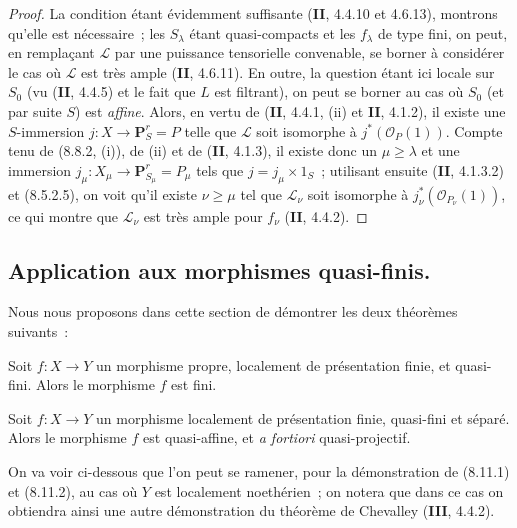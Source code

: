 \begin{proof}
La condition étant évidemment suffisante (\textbf{II}, 4.4.10 et 4.6.13), montrons
qu'elle est nécessaire~; les $S_\lambda$ étant quasi-compacts et les
$f_\lambda$ de type fini, on peut, en remplaçant $\mathcal L$ par une puissance
tensorielle convenable, se borner à considérer le cas où $\mathcal L$ est très
ample (\textbf{II}, 4.6.11). En outre, la question étant ici locale sur $S_0$ (vu
(\textbf{II}, 4.4.5) et le fait que $L$ est filtrant), on peut se borner au cas où
$S_0$ (et par suite $S$) est \emph{affine}. Alors, en vertu de (\textbf{II}, 4.4.1, (ii) et
\textbf{II}, 4.1.2), il existe une $S$-immersion
$j:X\to\mathbf P_S^r=P$ telle que $\mathcal L$ soit isomorphe à
$j^*(\mathcal O_P(1))$. Compte tenu de (8.8.2, (i)), de (ii) et de
(\textbf{II}, 4.1.3), il existe donc un $\mu\geq\lambda$ et une immersion
$j_\mu:X_\mu\to\mathbf P_{S_\mu}^r=P_\mu$ tels que
$j=j_\mu\times1_S$~; utilisant ensuite (\textbf{II}, 4.1.3.2) et (8.5.2.5), on voit
qu'il existe $\nu\geq\mu$ tel que $\mathcal L_\nu$ soit isomorphe à
$j_\nu^*(\mathcal O_{P_\nu}(1))$, ce qui montre que $\mathcal L_\nu$ est très
ample pour $f_\nu$ (\textbf{II}, 4.4.2).
\end{proof}

\subsection{Application aux morphismes quasi-finis.}
\label{subsection:IV.8.11-fr}
\label{IV.8.11-fr}

Nous nous proposons dans cette section de démontrer les deux théorèmes
suivants~:

\begin{theorem}[8.11.1]
Soit $f:X\to Y$ un morphisme propre, localement de présentation finie, et
quasi-fini. Alors le morphisme $f$ est fini.
\end{theorem}

\begin{theorem}[8.11.2]
\label{IV.8.11.2-fr}
Soit $f:X\to Y$ un morphisme localement de présentation finie, quasi-fini et
séparé. Alors le morphisme $f$ est quasi-affine, et \emph{a fortiori}
quasi-projectif.
\end{theorem}

\begin{remark}[8.11.3]
\label{IV.8.11.3-fr}
On va voir ci-dessous que l'on peut se ramener, pour la démonstration de
(8.11.1) et (8.11.2), au cas où $Y$ est localement noethérien~; on notera que
dans ce cas on obtiendra ainsi une autre démonstration du théorème de
Chevalley (\textbf{III}, 4.4.2).
\end{remark}

